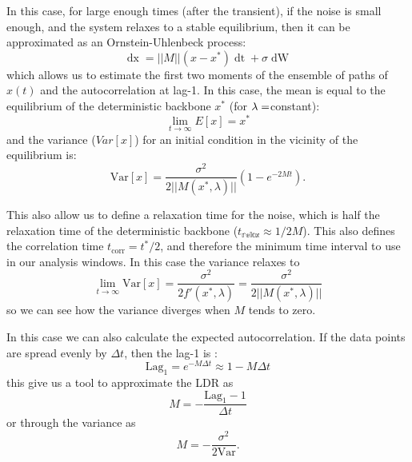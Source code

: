 In this case, for large enough times (after the transient), if the noise is small enough, and the system relaxes to a stable equilibrium, then it can be approximated as an Ornstein-Uhlenbeck process:
\begin{equation}
	\mathop{dx}=||M||(x-x^*)  \mathop{dt} + \sigma \mathop{dW}
	\label{eq: U-B process}
\end{equation}
 which allows us to estimate the first two moments of the ensemble of paths of  $x(t)$ and the autocorrelation at lag-1. In this case, the mean is equal to the equilibrium of the deterministic backbone $x^*$ (for $\lambda=$constant):
\begin{equation}
	\lim_{t\to\infty} E[x]=x^*
		\label{eq: mean}
\end{equation}
and the variance ($Var[x]$) for an initial condition in the vicinity of the equilibrium is:
\begin{equation}
	\mathrm{Var}[x]=\frac{\sigma^2}{2 ||M(x^*,\lambda)||}(1-e^{-2Mt}).
	\label{eq: ST_variance}
\end{equation}

This also allow us to define a relaxation time for the noise, which is half the relaxation time of the deterministic backbone ($t_\mathbb{relax}\approx 1/2M$). This also defines the correlation time $t_{\mathrm{corr}}=t^*/2$, and therefore the minimum time interval to use in our analysis windows. 
In this case the variance  relaxes to 
\begin{equation}
	\lim_{t\to\infty} \mathrm{Var}[x]=\frac{\sigma^2}{2f'(x^*,\lambda)}=\frac{\sigma^2}{2 ||M(x^*,\lambda)||}
	\label{eq: ST_variancelim}
\end{equation}
so we can see how the variance diverges when $M$ tends to zero.

In this case we can also calculate the expected autocorrelation. 
If the data points are spread evenly by $\Delta t$, then the lag-1 is \citep{Ritchie2016}:
\begin{equation}
	\mathrm{Lag}_{1}=e^{-M\Delta t }\approx 1-M\Delta t
	\label{eq:lag1}
\end{equation}
this give us a tool to approximate the LDR as
\begin{equation}
	M=-\frac{\mathrm{Lag}_1-1}{\Delta t}
	\label{eq:Mfromlag1}
\end{equation}
or through the variance as 
\begin{equation}
	M=-\frac{\sigma^2}{2 \mathrm{Var}}.
	\label{eq:Mfromvar}
\end{equation}

